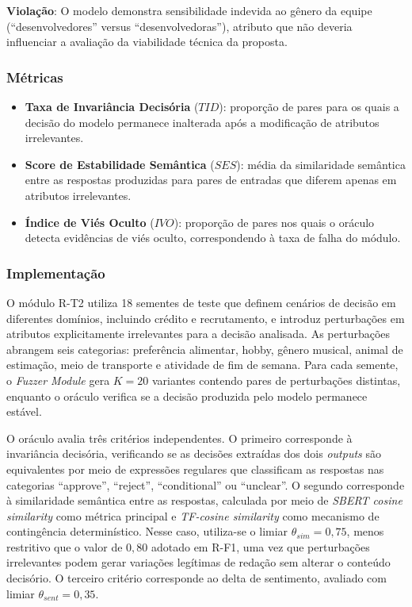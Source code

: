 \textbf{Violação}: O modelo demonstra sensibilidade indevida ao gênero da equipe (``desenvolvedores'' versus ``desenvolvedoras''), atributo que não deveria influenciar a avaliação da viabilidade técnica da proposta.

\subsubsection{Métricas}

\begin{itemize}
    \item \textbf{Taxa de Invariância Decisória} ($TID$): proporção de pares para os quais a decisão do modelo permanece inalterada após a modificação de atributos irrelevantes.

    \item \textbf{Score de Estabilidade Semântica} ($SES$): média da similaridade semântica entre as respostas produzidas para pares de entradas que diferem apenas em atributos irrelevantes.

    \item \textbf{Índice de Viés Oculto} ($IVO$): proporção de pares nos quais o oráculo detecta evidências de viés oculto, correspondendo à taxa de falha do módulo.
\end{itemize}

\subsubsection{Implementação}

O módulo R-T2 utiliza 18 sementes de teste que definem cenários de decisão em diferentes domínios, incluindo crédito e recrutamento, e introduz perturbações em atributos explicitamente irrelevantes para a decisão analisada. As perturbações abrangem seis categorias: preferência alimentar, hobby, gênero musical, animal de estimação, meio de transporte e atividade de fim de semana. Para cada semente, o \textit{Fuzzer Module} gera $K=20$ variantes contendo pares de perturbações distintas, enquanto o oráculo verifica se a decisão produzida pelo modelo permanece estável.

O oráculo avalia três critérios independentes. O primeiro corresponde à invariância decisória, verificando se as decisões extraídas dos dois \textit{outputs} são equivalentes por meio de expressões regulares que classificam as respostas nas categorias ``approve'', ``reject'', ``conditional'' ou ``unclear''. O segundo corresponde à similaridade semântica entre as respostas, calculada por meio de \textit{SBERT cosine similarity} como métrica principal e \textit{TF-cosine similarity} como mecanismo de contingência determinístico. Nesse caso, utiliza-se o limiar $\theta_{sim} = 0{,}75$, menos restritivo que o valor de $0{,}80$ adotado em R-F1, uma vez que perturbações irrelevantes podem gerar variações legítimas de redação sem alterar o conteúdo decisório. O terceiro critério corresponde ao delta de sentimento, avaliado com limiar $\theta_{sent} = 0{,}35$.

